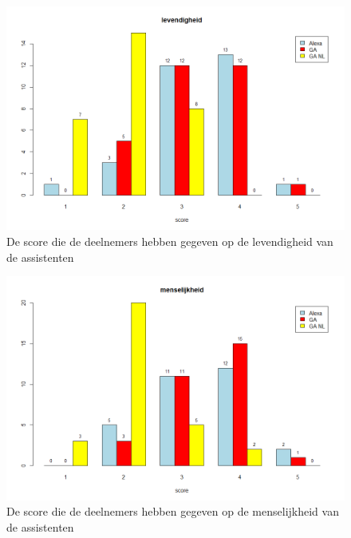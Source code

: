 \begin{figure}[H]
    \centering
    \includegraphics[width=0.9\linewidth]{../onderzoek/onderzoeksresultaten/vergelijking_assistenten_per_eigenschap/barplot/barplot_score_levendigheid}
    \caption{De score die de deelnemers hebben gegeven op de levendigheid van de assistenten}
    \label{fig:barplot-levendigheid}
\end{figure}

\begin{figure}[H]
    \centering
    \includegraphics[width=0.9\linewidth]{../onderzoek/onderzoeksresultaten/vergelijking_assistenten_per_eigenschap/barplot/barplot_score_menselijkheid}
    \caption{De score die de deelnemers hebben gegeven op de menselijkheid van de assistenten}
    \label{fig:barplot-menselijkheid}
\end{figure}

